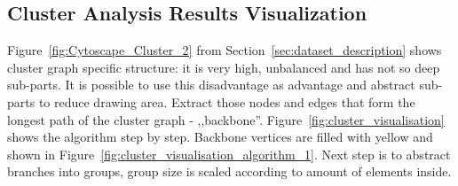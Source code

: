 \subsection{Cluster Analysis Results Visualization}
\label{sec:cluster}

Figure~\ref{fig:Cytoscape_Cluster_2} from Section~\ref{sec:dataset_description} shows cluster graph specific structure: it is very high, unbalanced and has not so deep sub-parts. It is possible to use this disadvantage as advantage and abstract sub-parts to reduce drawing area. Extract those nodes and edges that form the longest path of the cluster graph - ,,backbone''. Figure~\ref{fig:cluster_visualisation} shows the algorithm step by step. Backbone vertices are filled with yellow and shown in Figure~\ref{fig:cluster_visualisation_algorithm_1}. Next step is to abstract branches into groups, group size is scaled according to amount of elements inside.

